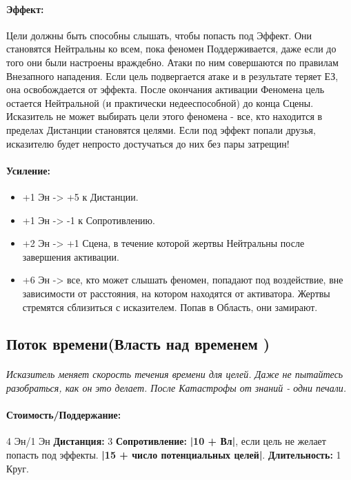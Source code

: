 \begin{itemize}
\begin{itemize}
\paragraph{Эффект: }Цели должны быть способны слышать, чтобы попасть под Эффект. Они становятся Нейтральны ко всем, пока феномен Поддерживается, даже если до того они были настроены враждебно. Атаки по ним совершаются по правилам Внезапного нападения. Если цель подвергается атаке и в результате теряет ЕЗ, она освобождается от эффекта. После окончания активации Феномена цель остается Нейтральной (и практически недееспособной) до конца Сцены. 
\newline Исказитель не может выбирать цели этого феномена - все, кто находится в пределах Дистанции становятся целями. Если под эффект попали друзья, исказителю будет непросто достучаться до них без пары затрещин!
\paragraph{Усиление:}
\begin{itemize}
\item+1 Эн -> +5 к Дистанции.
\item+1 Эн -> -1 к Сопротивлению.
\item+2 Эн -> +1 Сцена, в течение которой жертвы Нейтральны после завершения активации.
\item+6 Эн -> все, кто может слышать феномен, попадают под воздействие, вне зависимости от расстояния, на котором находятся от активатора. Жертвы стремятся сблизиться с исказителем. Попав в Область, они замирают.
\end{itemize}
\subsection{Поток времени(Власть над временем 
\tbd)}
\paragraph{} 
\textit{Исказитель меняет скорость течения времени для целей. Даже не пытайтесь разобраться, как он это делает. После Катастрофы от знаний - одни печали.}
\paragraph{Стоимость/Поддержание: }4 Эн/1 Эн
\newline
\textbf{Дистанция: }3
\newline
\textbf{Сопротивление: }
\textbf{|10 + Вл|}, если цель не желает попасть под эффекты. 
\textbf{|15 + число потенциальных целей|}.
\tbd
\newline 
\textbf{Длительность: }1 Круг.

\end{itemize}
\end{itemize}
